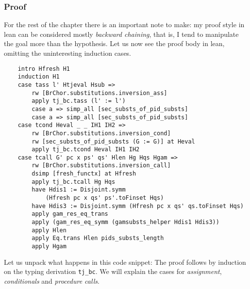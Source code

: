 \documentclass[12pt,a4paper,twoside]{book}
\begin{document}
\subsubsection{Proof}
For the rest of the chapter there is an important note to make: my proof style in lean can be considered mostly \emph{backward chaining}\cite{al2015comparison}, that is, I tend to manipulate the goal more than the hypothesis.
Let us now see the proof body in lean, omitting the uninteresting induction cases.
\begin{samepage}
\begin{verbatim}
    intro Hfresh H1
    induction H1
    case tass l' Htjeval Hsub =>
        rw [BrChor.substitutions.inversion_ass]
        apply tj_bc.tass (l' := l')
        case a => simp_all [sec_substs_of_pid_substs]
        case a => simp_all [sec_substs_of_pid_substs]
    case tcond Heval _ _ IH1 IH2 =>
        rw [BrChor.substitutions.inversion_cond]
        rw [sec_substs_of_pid_substs (G := G)] at Heval
        apply tj_bc.tcond Heval IH1 IH2
    case tcall G' pc x ps' qs' Hlen Hg Hqs Hgam =>
        rw [BrChor.substitutions.inversion_call]
        dsimp [fresh_functx] at Hfresh
        apply tj_bc.tcall Hg Hqs
        have Hdis1 := Disjoint.symm
            (Hfresh pc x qs' ps'.toFinset Hqs)
        have Hdis3 := Disjoint.symm (Hfresh pc x qs' qs.toFinset Hqs)
        apply gam_res_eq_trans
        apply (gam_res_eq_symm (gamsubsts_helper Hdis1 Hdis3))
        apply Hlen
        apply Eq.trans Hlen pids_substs_length
        apply Hgam
\end{verbatim}
\end{samepage}
Let us unpack what happens in this code snippet: The proof follows by induction on the typing derivation \texttt{tj\_bc}. We will explain the cases for \emph{assignment}, \emph{conditionals} and \emph{procedure calls}.
\end{document}
